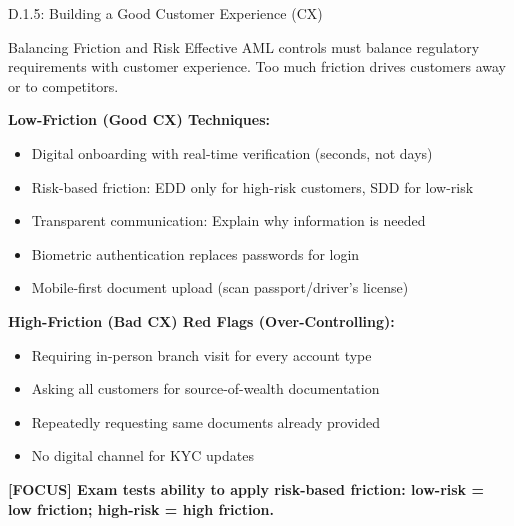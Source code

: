 \documentclass[11pt,a4paper]{beamer}
\newcommand{\examfocus}[1]{\textcolor{orange!80!black}{\textbf{[FOCUS] #1}}}
\begin{document}
\begin{frame}{D.1.5: Building a Good Customer Experience (CX)}
	\begin{block}{Balancing Friction and Risk}
		Effective AML controls must balance regulatory requirements with customer experience. Too much friction drives customers away or to competitors.
	\end{block}
	\textbf{Low-Friction (Good CX) Techniques:}
	\begin{itemize}
		\item Digital onboarding with real-time verification (seconds, not days)
		\item Risk-based friction: EDD only for high-risk customers, SDD for low-risk
		\item Transparent communication: Explain why information is needed
		\item Biometric authentication replaces passwords for login
		\item Mobile-first document upload (scan passport/driver's license)
	\end{itemize}
	\textbf{High-Friction (Bad CX) Red Flags (Over-Controlling):}
	\begin{itemize}
		\item Requiring in-person branch visit for every account type
		\item Asking all customers for source-of-wealth documentation
		\item Repeatedly requesting same documents already provided
		\item No digital channel for KYC updates
	\end{itemize}
	\examfocus{Exam tests ability to apply risk-based friction: low-risk = low friction; high-risk = high friction.}
\end{frame}
\end{document}
